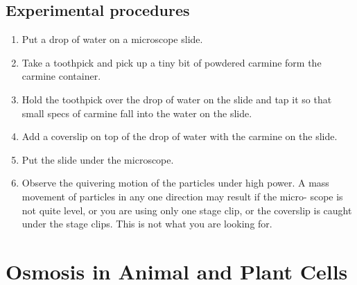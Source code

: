 \documentclass[]{book}
\providecommand{\tightlist}{%
  \setlength{\itemsep}{0pt}\setlength{\parskip}{0pt}}
\begin{document}
\hypertarget{experimental-procedures-17}{%
\subsection{Experimental procedures}\label{experimental-procedures-17}}

\begin{enumerate}
\def\labelenumi{\arabic{enumi}.}
\tightlist
\item
  Put a drop of water on a microscope slide.
\item
  Take a toothpick and pick up a tiny bit of powdered carmine form the carmine container.
\item
  Hold the toothpick over the drop of water on the slide and tap it so that small specs of carmine fall into the water on the slide.
\item
  Add a coverslip on top of the drop of water with the carmine on the slide.
\item
  Put the slide under the microscope.
\item
  Observe the quivering motion of the particles under high power. A mass movement of particles in any one direction may result if the micro- scope is not quite level, or you are using only one stage clip, or the coverslip is caught under the stage clips. This is not what you are looking for.
\end{enumerate}

\hypertarget{osmosis-in-animal-and-plant-cells}{%
\section{Osmosis in Animal and Plant Cells}\label{osmosis-in-animal-and-plant-cells}}
\end{document}
